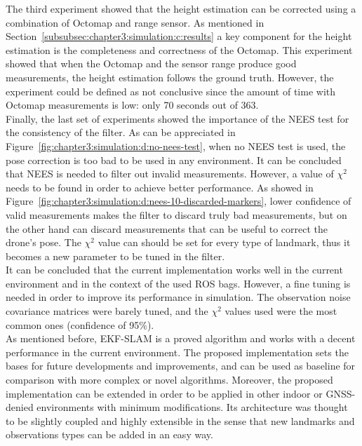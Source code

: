 The third experiment showed that the height estimation can be corrected using a combination of Octomap and range sensor. As mentioned in Section~\ref{subsubsec:chapter3:simulation:c:results} a key component for the height estimation is the completeness and correctness of the Octomap. This experiment showed that when the Octomap and the sensor range produce good measurements, the height estimation follows the ground truth. However, the experiment could be defined as not conclusive since the amount of time with Octomap measurements is low: only 70 seconds out of 363.\\

Finally, the last set of experiments showed the importance of the \ac{NEES} test for the consistency of the filter. As can be appreciated in Figure~\ref{fig:chapter3:simulation:d:no-nees-test}, when no \ac{NEES} test is used, the pose correction is too bad to be used in any environment. It can be concluded that \ac{NEES} is needed to filter out invalid measurements. However, a value of $\chi^2$ needs to be found in order to achieve better performance. As showed in Figure~\ref{fig:chapter3:simulation:d:nees-10-discarded-markers}, lower confidence of valid measurements makes the filter to discard truly bad measurements, but on the other hand can discard measurements that can be useful to correct the drone's pose. The $\chi^2$ value can should be set for every type of landmark, thus it becomes a new parameter to be tuned in the filter.\\

It can be concluded that the current implementation works well in the current environment and in the context of the used \ac{ROS} bags. However, a fine tuning is needed in order to improve its performance in simulation. The observation noise covariance matrices were barely tuned, and the $\chi^2$ values used were the most common ones (confidence of 95\%).\\

As mentioned before, EKF-SLAM is a proved algorithm and works with a decent performance in the current environment. The proposed implementation sets the bases for future developments and improvements, and can be used as baseline for comparison with more complex or novel algorithms. Moreover, the proposed implementation can be extended in order to be applied in other indoor or GNSS-denied environments with minimum modifications. Its architecture was thought to be slightly coupled and highly extensible in the sense that new landmarks and observations types can be added in an easy way.

